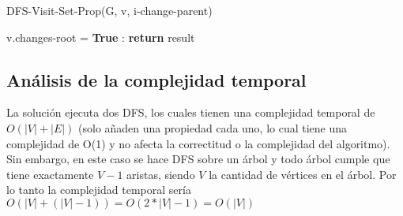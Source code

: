 \documentclass[a4paper,10pt]{article}
\begin{document}
	\begin{algorithm}[H] 
		\caption{DFS-Visit-Set-Prop(G, v, i-change-parent)}
		\begin{algorithmic}[1]
				\State \textnormal{v.changes-root = \bf{True}}
			\EndIf	
			:
				\EndIf
				\EndFor
			\State \textbf{return} result
			
		\end{algorithmic}
	\end{algorithm}

	\subsection{Análisis de la complejidad temporal}
	La soluci\'on ejecuta dos DFS, los cuales tienen una complejidad temporal de $O(|V| + |E|)$ (solo a\~naden una propiedad cada uno, lo cual tiene una complejidad de O(1) y no afecta la correctitud o la complejidad del algoritmo). Sin embargo, en este caso se hace DFS sobre un \'arbol y todo \'arbol cumple que tiene exactamente $V - 1$ aristas, siendo $V$ la cantidad de v\'ertices en el \'arbol. Por lo tanto la complejidad temporal ser\'ia $O(|V| + (|V| - 1)) = O(2*|V| - 1) = O(|V|)$
\end{document}
